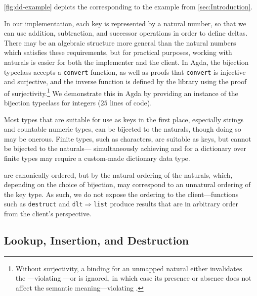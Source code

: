 \autoref{fig:dd-example} depicts the \dd{} corresponding to the example from \autoref{sec:Introduction}.


In our implementation, each key is represented by a natural number, so that we can use addition, subtraction, and successor operations in order to define deltas.
%
There may be an algebraic structure more general than the natural numbers which satisfies these requirements, but for practical purposes, working with naturals
%
is easier for both the implementer and the client. In Agda, the bijection typeclass accepts a \texttt{convert} function, as well as proofs that \texttt{convert}
%
is injective and surjective, and the inverse function is defined by the library using the proof of surjectivity.\footnote{\hspace{0.01in}%
%
Without surjectivity, a binding for an unmapped natural either invalidates the \dd---violating \Total---or is ignored, in which case its presence or absence does not affect the semantic meaning---violating \Extensional.
%
}
%
We demonstrate this in Agda by
%
providing an instance of the bijection typeclass for integers ($25$ lines of code).

Most types that are suitable for use as keys in the first place, especially strings and countable numeric types, can be bijected to the naturals,
%
though doing so may be onerous. Finite types, such as characters, are suitable as keys, but cannot be bijected to the naturals---%
%
simultaneously achieving \Total{} and \Extensional{} for a dictionary over finite types may require a custom-made dictionary data type.

\Ddls{} are canonically ordered, but by the natural ordering of the naturals, which, depending on the choice of bijection, may correspond to an unnatural
%
ordering of the key type. As such, we do not expose the ordering to the client---functions such as \texttt{destruct} and \texttt{dlt$\Rightarrow$list} produce results
%
that are in arbitrary order from the client's perspective.


\subsection{Lookup, Insertion, and Destruction}
\label{sec:DD:basics}

